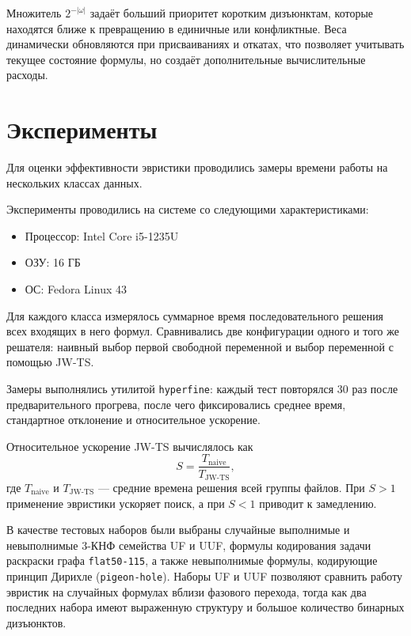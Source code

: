 \documentclass[a4paper]{article}
\begin{document}
Множитель $2^{-|\omega|}$ задаёт больший приоритет коротким дизъюнктам, которые
находятся ближе к превращению в единичные или конфликтные. Веса динамически
обновляются при присваиваниях и откатах, что позволяет учитывать текущее
состояние формулы, но создаёт дополнительные вычислительные расходы.

\section{Эксперименты}

Для оценки эффективности эвристики проводились замеры времени работы на нескольких классах данных.

Эксперименты проводились на системе со следующими характеристиками:

\begin{itemize}
  \item Процессор: Intel Core i5-1235U
  \item ОЗУ: 16 ГБ
  \item ОС: Fedora Linux 43
\end{itemize}

Для каждого класса измерялось суммарное время последовательного решения всех
входящих в него формул. Сравнивались две конфигурации одного и того же
решателя: наивный выбор первой свободной переменной и выбор переменной с
помощью JW-TS.

Замеры выполнялись утилитой \texttt{hyperfine}: каждый тест повторялся 30 раз
после предварительного прогрева, после чего фиксировались среднее время,
стандартное отклонение и относительное ускорение.

Относительное ускорение JW-TS вычислялось как
\begin{equation}
    S = \frac{T_{\text{naive}}}{T_{\text{JW-TS}}},
\end{equation}
где $T_{\text{naive}}$ и $T_{\text{JW-TS}}$ --- средние времена решения всей
группы файлов. При $S>1$ применение эвристики ускоряет поиск, а при $S<1$
приводит к замедлению.

В качестве тестовых наборов были выбраны случайные выполнимые и невыполнимые
3-КНФ семейства UF и UUF, формулы кодирования задачи раскраски графа
\texttt{flat50-115}, а также невыполнимые формулы, кодирующие принцип Дирихле
(\texttt{pigeon-hole}). Наборы UF и UUF позволяют сравнить работу эвристик на
случайных формулах вблизи фазового перехода, тогда как два последних набора
имеют выраженную структуру и большое количество бинарных дизъюнктов.
\end{document}
